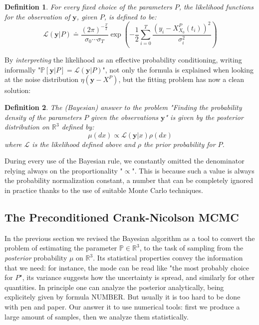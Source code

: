 \documentclass[8pt]{article}
\newtheorem{definition}{Definition}
\begin{document}
\begin{definition}
For every fixed choice of the parameters $P$, the likelihood functions
for the observation of $\textbf{y}$, given $P$, is defined to be:
	\begin{equation}
	\mathcal{L}(\textbf{y}|P) \doteq 
		\frac{(2 \pi)^{- \frac{T}{2}}}
		{\sigma_0\cdots\sigma_{T}}
		\exp \left( -\frac{1}{2} 
		\sum_{i=0}^{T} 
		\frac{(y_i - X_{X_0}^P(t_i))^2}
		{\sigma_i^2}
		\right )
	\end{equation}
\end{definition}


By \emph{interpreting} the likelihood as an effective probability
conditioning, writing informally 
"$\mathbb{P}[\textbf{y}|P] = \mathcal{L}(\textbf{y}|P)$",
not only 
the formula is explained when looking at the noise
distribution $\eta(\textbf{y} - X^P)$, but the 
fitting problem has now a clean solution:

\begin{definition}
	The (Bayesian)
	answer to the problem "Finding the probability density of
	the parameters $P$ given the observations $\textbf{y}$"
	is given by the \emph{posterior}
	distribution on $\mathbb{R}^{3}$ defined by:
	\begin{equation}
		\mu(dx) \propto \mathcal{L}(\textbf{y} | x) \rho(dx)
	\end{equation}
	where $\mathcal{L}$ is the likelihood defined above
	and $\rho$ the prior probability for $P$.
\end{definition}


During every use of the Bayesian rule, we constantly omitted the denominator
relying always on the proportionality "$\propto$". 
This is because such a value is always the probability 
normalization constant,
a number that can be completely ignored in practice thanks to the use
of suitable Monte Carlo techniques.


\subsection{The Preconditioned Crank-Nicolson MCMC}
In the previous section we revised the Bayesian algorithm
as a tool to convert the problem of
estimating the parameter $\mathbb{P} \in \mathbb{R}^3$, to the task
of sampling from the \emph{posterior} probability $\mu$ on $\mathbb{R}^3$.
Its statistical properties convey the information that we need:
for instance, the mode can be read like "the most probably
choice for $P$", its variance suggests how the uncertainty
is spread, and similarly for other quantities.
In principle one can analyze the posterior analytically,
being explicitely given by formula NUMBER.
But usually it is too hard to be done with pen and paper.
Our answer it to use numerical tools: first we
produce a large amount of samples, then we analyze them
statistically.
\end{document}
